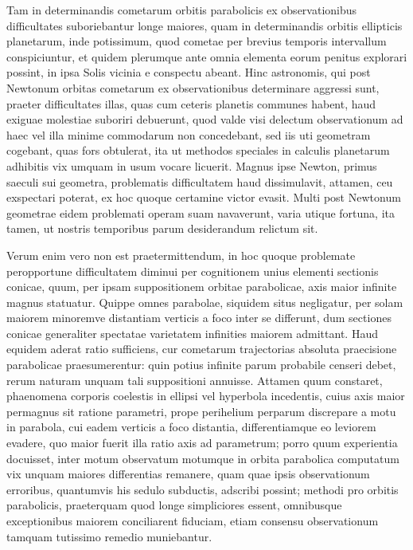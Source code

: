 \documentclass[12pt,a4paper]{book}
\begin{document}
Tam in determinandis cometarum orbitis parabolicis ex observationibus difficultates suboriebantur longe maiores, quam in determinandis orbitis ellipticis planetarum, inde potissimum, quod cometae per brevius temporis intervallum conspiciuntur, et quidem plerumque ante omnia elementa eorum penitus explorari possint, in ipsa Solis vicinia e conspectu abeant. Hinc astronomis, qui post Newtonum orbitas cometarum ex observationibus determinare aggressi sunt, praeter difficultates illas, quas cum ceteris planetis communes habent, haud exiguae molestiae suboriri debuerunt, quod valde visi delectum observationum ad haec vel illa minime commodarum non concedebant, sed iis uti geometram cogebant, quas fors obtulerat, ita ut methodos speciales in calculis planetarum adhibitis vix umquam in usum vocare licuerit. Magnus ipse Newton, primus saeculi sui geometra, problematis difficultatem haud dissimulavit, attamen, ceu exspectari poterat, ex hoc quoque certamine victor evasit. Multi post Newtonum geometrae eidem problemati operam suam navaverunt, varia utique fortuna, ita tamen, ut nostris temporibus parum desiderandum relictum sit.

Verum enim vero non est praetermittendum, in hoc quoque problemate peropportune difficultatem diminui per cognitionem unius elementi sectionis conicae, quum, per ipsam suppositionem orbitae parabolicae, axis maior infinite magnus statuatur. Quippe omnes parabolae, siquidem situs negligatur, per solam maiorem minoremve distantiam verticis a foco inter se differunt, dum sectiones conicae generaliter spectatae varietatem infinities maiorem admittant. Haud equidem aderat ratio sufficiens, cur cometarum trajectorias absoluta praecisione parabolicae praesumerentur: quin potius infinite parum probabile censeri debet, rerum naturam unquam tali suppositioni annuisse. Attamen quum constaret, phaenomena corporis coelestis in ellipsi vel hyperbola incedentis, cuius axis maior permagnus sit ratione parametri, prope perihelium perparum discrepare a motu in parabola, cui eadem verticis a foco distantia, differentiamque eo leviorem evadere, quo maior fuerit illa ratio axis ad parametrum; porro quum experientia docuisset, inter motum observatum motumque in orbita parabolica computatum vix unquam maiores differentias remanere, quam quae ipsis observationum erroribus, quantumvis his sedulo subductis, adscribi possint; methodi pro orbitis parabolicis, praeterquam quod longe simpliciores essent, omnibusque exceptionibus maiorem conciliarent fiduciam, etiam consensu observationum tamquam tutissimo remedio muniebantur.
\end{document}
